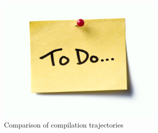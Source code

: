 \begin{figure}[!tbp]
  \centering
  \begin{minipage}[b]{0.80\textwidth}
    \graphicspath{ {../../assets/images/misc/} }
    \includegraphics[width=300px]{todo.jpg}
    \caption{Comparison of compilation trajectories}
    \label{fig:wasm-trajectory}
  \end{minipage}
\end{figure}




